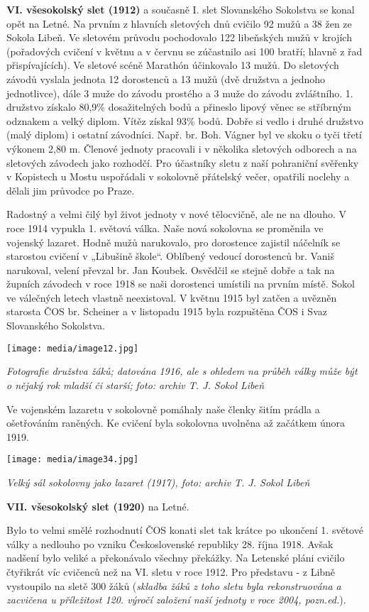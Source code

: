 \textbf{VI. všesokolský slet (1912)} a současně I. slet Slovanského
Sokolstva se konal opět na Letné. Na prvním z hlavních sletových dnů
cvičilo 92 mužů a 38 žen ze Sokola Libeň. Ve sletovém průvodu
pochodovalo 122 libeňských mužů v krojích (pořadových cvičení v květnu a
v červnu se zúčastnilo asi 100 bratří; hlavně z řad přispívajících). Ve
sletové scéně Marathón účinkovalo 13 mužů. Do sletových závodů vyslala
jednota 12 dorostenců a 13 mužů (dvě družstva a jednoho jednotlivce),
dále 3 muže do závodu prostého a 3 muže do závodu zvláštního. 1.
družstvo získalo 80,9\% dosažitelných bodů a přineslo lipový věnec se
stříbrným odznakem a velký diplom. Vítěz získal 93\% bodů. Dobře si
vedlo i druhé družstvo (malý diplom) i ostatní závodníci. Např. br. Boh.
Vágner byl ve skoku o tyči třetí výkonem 2,80 m. Členové jednoty
pracovali i v několika sletových odborech a na sletových závodech jako
rozhodčí. Pro účastníky sletu z naší pohraniční svěřenky v Kopistech u
Mostu uspořádali v sokolovně přátelský večer, opatřili noclehy a dělali
jim průvodce po Praze.

Radostný a velmi čilý byl život jednoty v nové tělocvičně, ale ne na
dlouho. V roce 1914 vypukla 1. světová válka. Naše nová sokolovna se
proměnila ve vojenský lazaret. Hodně mužů narukovalo, pro dorostence
zajistil náčelník se starostou cvičení v „Libušině škole``. Oblíbený
vedoucí dorostenců br. Vaniš narukoval, velení převzal br. Jan Koubek.
Osvědčil se stejně dobře a tak na župních závodech v roce 1918 se naši
dorostenci umístili na prvním místě. Sokol ve válečných letech vlastně
neexistoval. V květnu 1915 byl zatčen a uvězněn starosta ČOS br.
Scheiner a v listopadu 1915 byla rozpuštěna ČOS i Svaz Slovanského
Sokolstva.

\texttt{[image: media/image12.jpg]}

\emph{Fotografie družstva žáků; datována 1916, ale s ohledem na průběh
války může být o nějaký rok mladší či starší;} \emph{foto: archiv T. J.
Sokol Libeň}

Ve vojenském lazaretu v sokolovně pomáhaly naše členky šitím prádla a
ošetřováním raněných. Ke cvičení byla sokolovna uvolněna až začátkem
února 1919.

\texttt{[image: media/image34.jpg]}

\emph{Velký sál sokolovny jako lazaret (1917), foto: archiv T. J. Sokol
Libeň}

\textbf{VII. všesokolský slet (1920)} na Letné.

Bylo to velmi smělé rozhodnutí ČOS konati slet tak krátce po ukončení 1.
světové války a nedlouho po vzniku Československé republiky 28. října
1918. Avšak nadšení bylo veliké a překonávalo všechny překážky. Na
Letenské pláni cvičilo čtyřikrát víc cvičenců než na VI. sletu v roce
1912. Pro představu - z Libně vystoupilo na sletě 300 žáků
(\emph{skladba žáků z toho sletu byla rekonstruována a zacvičena u
příležitost 120. výročí založení naší jednoty v roce 2004, pozn.ed.}).

